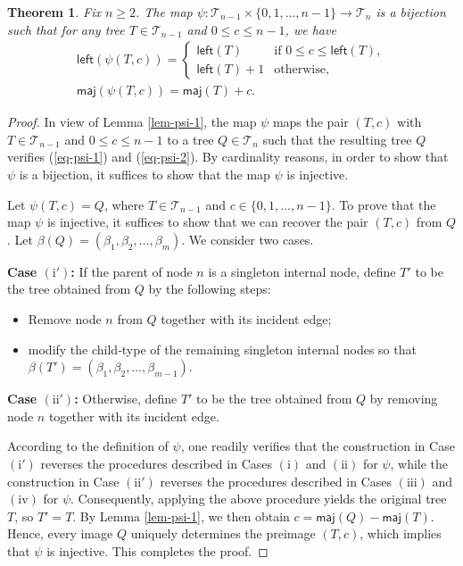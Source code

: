 \documentclass[12pt]{article}
\numberwithin{equation}{section}
\theoremstyle{plain}
\newtheorem{theorem}{Theorem}[section]
\def\maj{\mathsf{maj}}
\def\l{\mathsf{left}}
\def\l{\mathsf{left}}
\def\B{\mathcal{T}}
\begin{document}
	 		\begin{theorem}\label{thm-psi}
	 			Fix $n\geq 2$.  The map $\psi\colon \B_{n-1}\times \{0,1,\dots,n-1\}\rightarrow  \B_{n}$ is a bijection such that for any tree  $T\in \B_{n-1}$ and $0\le c\le n-1$, we have
	 	\begin{gather}
	 		\l(\psi(T, c))=
	 		\begin{cases}
	 			\l(T) & \text{if } 0\le c\le \l(T),\\[2pt]
	 			\l(T)+1 & \text{otherwise},
	 		\end{cases}
	 		\label{eq-psi-1}\\[4pt]
	 		\maj(\psi(T, c))=\maj(T)+c.
	 		\label{eq-psi-2}
	 	\end{gather}
	 				 
	 			\end{theorem}
	 			\begin{proof}
	 		In view of  Lemma \ref{lem-psi-1},   the map $\psi$ maps the pair $(T,c)$ with $T\in \B_{n-1}$ and $0\leq c\leq n-1$ to a tree $Q\in \B_n$ such that the resulting tree $Q$ verifies (\ref{eq-psi-1}) and (\ref{eq-psi-2}).  
	 			By cardinality reasons,  in order to show that $\psi$ is a bijection, it suffices to show that the map $\psi$ is injective. 
	 
	 			Let $\psi(T, c)=Q$, where $T\in \B_{n-1}$ and $c\in \{0,1,\dots, n-1\}$. To prove that the map $\psi$ is injective, it suffices to show that we can recover the pair $(T,c)$ from $Q$. Let $\beta(Q)=(\beta_1, \beta_2, \ldots, \beta_m)$. We consider two cases.
	 			
	 			\noindent\textbf{Case $\mathrm{(i')}$:} If the parent of node $n$ is a singleton internal node, define $T'$ to be the tree obtained from $Q$ by the following steps:
	 			\begin{itemize}
	 				\item Remove node $n$ from $Q$ together with its incident edge;
	 				\item modify the child‑type of the remaining singleton internal nodes so that $\beta(T')=(\beta_1, \beta_2, \ldots, \beta_{m-1})$.
	 			\end{itemize}
	 			
	 			\noindent\textbf{Case $\mathrm{(ii')}$:} Otherwise, define $T'$ to be the tree obtained from $Q$ by removing node $n$ together with its incident edge.
	 			
	 			According to the definition of $\psi$, one readily verifies that the construction in Case $\mathrm{(i')}$ reverses the procedures  described in Cases $\mathrm{(i)}$ and  $\mathrm{(ii)}$ for $\psi$, while the construction in Case $\mathrm{(ii')}$ reverses the procedures  described  in Cases $\mathrm{(iii)}$ and $\mathrm{(iv)}$ for $\psi$. Consequently, applying the above procedure yields the original tree $T$, so $T'=T$. By Lemma \ref{lem-psi-1}, we then obtain $c=\maj(Q)-\maj(T)$.   Hence, every image $Q$ uniquely determines the preimage $(T,c)$, which implies that $\psi$ is injective. This completes the proof.
	 			 
	 				
	 				\end{proof}
	 				
\end{document}
